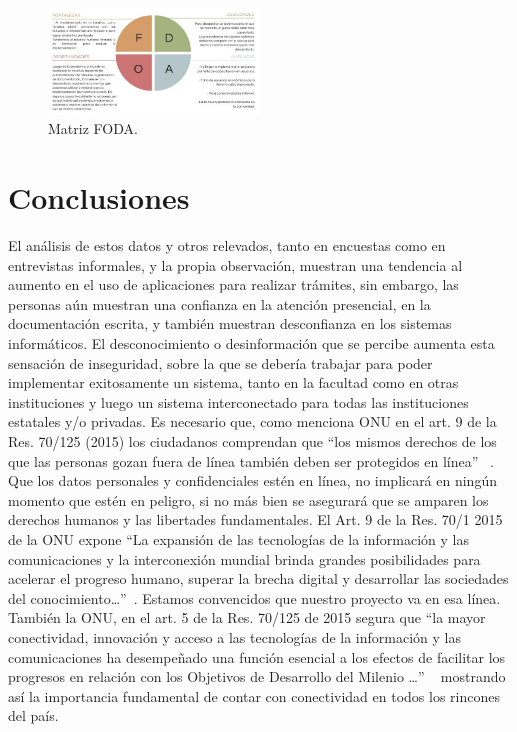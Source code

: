 \documentclass[a4paper]{article}
\begin{document}
\begin{figure}
\centering
\includegraphics[width=0.5\textwidth]{Imagen10.jpg}
\caption{\label{fig:Imagen10}Matriz FODA.}
\end{figure}

\section{Conclusiones}

El análisis de estos datos y otros relevados, tanto en encuestas como en entrevistas informales, y la propia observación, muestran una tendencia al aumento en el uso de aplicaciones para realizar trámites, sin embargo, las personas aún muestran una confianza en la atención presencial, en la documentación escrita, y también muestran desconfianza en los sistemas informáticos. El desconocimiento o desinformación que se percibe aumenta esta sensación de inseguridad, sobre la que se debería trabajar para poder implementar exitosamente un sistema, tanto en la facultad como en otras instituciones y luego un sistema interconectado para todas las instituciones estatales y/o privadas. Es necesario que, como menciona ONU en el art. 9 de la Res. 70/125 (2015) los ciudadanos comprendan que “los mismos derechos de los que las personas gozan fuera de línea también deben ser protegidos en línea” ~\cite{onu15}. Que los datos personales y confidenciales estén en línea, no implicará en ningún momento que estén en peligro, si no más bien se asegurará que se amparen los derechos humanos y las libertades fundamentales. 
El Art. 9 de la Res. 70/1 2015 de la ONU expone “La expansión de las tecnologías de la información y las comunicaciones y la interconexión mundial brinda grandes posibilidades para acelerar el progreso humano, superar la brecha digital y desarrollar las sociedades del conocimiento…”~\cite{onu15}. Estamos convencidos que nuestro proyecto va en esa línea. 
También la ONU, en el art. 5 de la Res. 70/125  de 2015 segura que “la mayor conectividad, innovación y acceso a las tecnologías de la información y las comunicaciones ha desempeñado una función esencial a los efectos de facilitar los progresos en relación con los Objetivos de Desarrollo del Milenio …” ~\cite{onu15} mostrando así la importancia fundamental de contar con conectividad en todos los rincones del país. 

\onecolumn

\printbibliography
\end{document}
